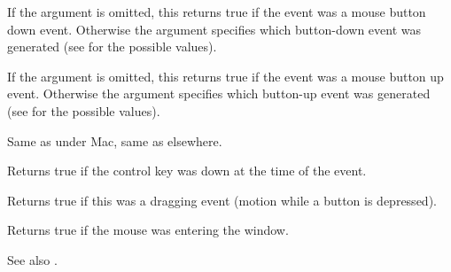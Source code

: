 \label{wxmouseeventbuttondown}


If the argument is omitted, this returns true if the event was a mouse
button down event. Otherwise the argument specifies which button-down event
was generated (see  for the possible
values).



\label{wxmouseeventbuttonup}


If the argument is omitted, this returns true if the event was a mouse
button up event. Otherwise the argument specifies which button-up event
was generated (see  for the possible
values).



\label{wxmouseeventcmddown}


Same as  under Mac, same as 
 elsewhere.




\label{wxmouseeventcontroldown}


Returns true if the control key was down at the time of the event.


\label{wxmouseeventdragging}


Returns true if this was a dragging event (motion while a button is depressed).




\label{wxmouseevententering}


Returns true if the mouse was entering the window.

See also .


